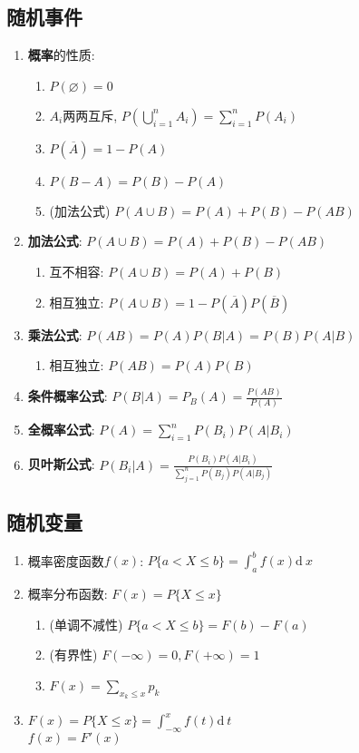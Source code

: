 \documentclass[10pt,a4paper,nofonts]{ctexart}
\newcommand{\D}{\displaystyle}
\renewcommand{\d}{{\mathrm{d}\:\!}}
\renewcommand{\le}{\leqslant}
\begin{document}

\begin{multicols}{2}

\subsection{随机事件}

\begin{enumerate}
\item {\bf 概率}的性质: 
\begin{enumerate}
\item $P(\varnothing)=0$
\item $A_i$两两互斥, $P(\bigcup_{i=1}^{n}{A_i})=\sum_{i=1}^{n}{P(A_i)}$
\item $P(\overline{A})=1-P(A)$
\item $P(B-A)=P(B)-P(A)$
\item (加法公式) $P(A\cup B)=P(A)+P(B)-P(AB)$
\end{enumerate}

\item {\bf 加法公式}: $P(A\cup B)=P(A)+P(B)-P(AB)$
\begin{enumerate}
\item 互不相容: $P(A\cup B)=P(A)+P(B)$
\item 相互独立: $P(A\cup B)=1-P(\overline{A})P(\overline{B})$
\end{enumerate}

\item {\bf 乘法公式}: $P(AB)=P(A)P(B|A)=P(B)P(A|B)$
\begin{enumerate}
\item 相互独立: $P(AB)=P(A)P(B)$
\end{enumerate}
\item {\bf 条件概率公式}: $P(B|A)=P_B(A)=\D\frac{P(AB)}{P(A)}$
\item {\bf 全概率公式}: $P(A)=\sum_{i=1}^{n}{P(B_i)P(A|B_i)}$
\item {\bf 贝叶斯公式}: $P(B_i|A)=\D\frac{P(B_i)P(A|B_i)}{\sum_{j=1}^{n}{P(B_j)P(A|B_j)}}$

\end{enumerate}

\subsection{随机变量}

\begin{enumerate}
\item 概率密度函数$f(x)$: $P\{a<X\le b\}=\int_a^b f(x)\d x$
\item 概率分布函数: $F(x)=P\{X\le x\}$
\begin{enumerate}
\item (单调不减性) $P\{a<X\le b\}=F(b)-F(a)$
\item (有界性) $F(-\infty)=0, F(+\infty)=1$
\item $F(x)=\sum_{x_k\le x}p_k$
\end{enumerate}
\item $F(x)=P\{X\le x\}=\int_{-\infty}^{x}f(t)\d t$\\$f(x)=F'(x)$


\end{enumerate}
\end{multicols}
\end{document}
